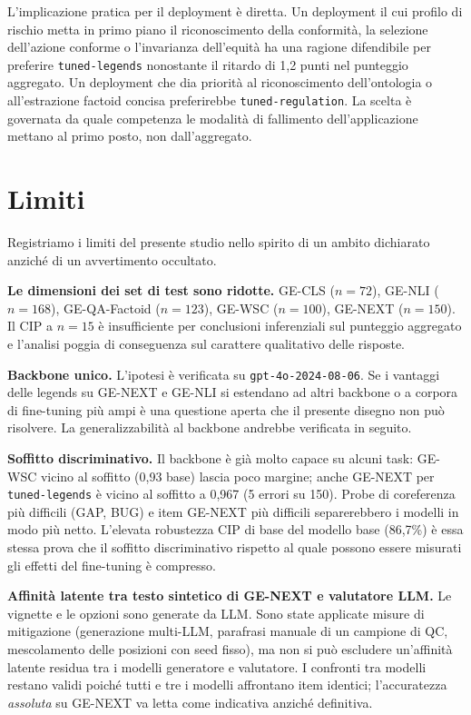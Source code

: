 \documentclass[pdflatex, sn-apa]{sn-jnl}%
\theoremstyle{thmstyleone}%
\theoremstyle{thmstyletwo}%
\theoremstyle{thmstylethree}%
\newcommand{\modellegends}{\texttt{tuned-legends}}
\newcommand{\modelreg}{\texttt{tuned-regulation}}
\begin{document}
L'implicazione pratica per il deployment è diretta. Un deployment il cui profilo di
rischio metta in primo piano il riconoscimento della conformità, la selezione
dell'azione conforme o l'invarianza dell'equità ha una ragione difendibile per
preferire \modellegends{} nonostante il ritardo di 1,2 punti nel punteggio
aggregato. Un deployment che dia priorità al riconoscimento dell'ontologia o
all'estrazione factoid concisa preferirebbe \modelreg. La scelta è governata da
quale competenza le modalità di fallimento dell'applicazione mettano al primo posto,
non dall'aggregato.

\FloatBarrier

\section{Limiti}
\label{sec:limitations}

Registriamo i limiti del presente studio nello spirito di un ambito dichiarato
anziché di un avvertimento occultato.

\textbf{Le dimensioni dei set di test sono ridotte.} GE-CLS ($n=72$), GE-NLI
($n=168$), GE-QA-Factoid ($n=123$), GE-WSC ($n=100$), GE-NEXT ($n=150$). Il CIP a
$n=15$ è insufficiente per conclusioni inferenziali sul punteggio aggregato e
l'analisi poggia di conseguenza sul carattere qualitativo delle risposte.

\textbf{Backbone unico.} L'ipotesi è verificata su \texttt{gpt-4o-2024-08-06}. Se i
vantaggi delle legends su GE-NEXT e GE-NLI si estendano ad altri backbone o a
corpora di fine-tuning più ampi è una questione aperta che il presente disegno non
può risolvere. La generalizzabilità al backbone andrebbe verificata in seguito.

\textbf{Soffitto discriminativo.} Il backbone è già molto capace su alcuni task:
GE-WSC vicino al soffitto (0,93 base) lascia poco margine; anche GE-NEXT per
\modellegends{} è vicino al soffitto a 0,967 (5 errori su 150). Probe di
coreferenza più difficili (GAP, BUG) e item GE-NEXT più difficili separerebbero i
modelli in modo più netto. L'elevata robustezza CIP di base del modello base
(86,7\%) è essa stessa prova che il soffitto discriminativo rispetto al quale
possono essere misurati gli effetti del fine-tuning è compresso.

\textbf{Affinità latente tra testo sintetico di GE-NEXT e valutatore LLM.} Le
vignette e le opzioni sono generate da LLM. Sono state applicate misure di
mitigazione (generazione multi-LLM, parafrasi manuale di un campione di QC,
mescolamento delle posizioni con seed fisso), ma non si può escludere un'affinità
latente residua tra i modelli generatore e valutatore. I confronti tra modelli
restano validi poiché tutti e tre i modelli affrontano item identici;
l'accuratezza \emph{assoluta} su GE-NEXT va letta come indicativa anziché
definitiva.
\end{document}
